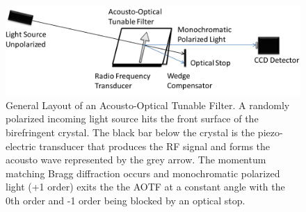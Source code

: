 \begin{figure}
    \includegraphics[width=1.0\textwidth]{./Images/3-1-AOTFGeneralLayout.pdf}
    \caption[Layout of an AOTF]{General Layout of an Acousto-Optical Tunable Filter. A randomly polarized incoming light source hits the front surface of the birefringent crystal. The black bar below the crystal is the piezo-electric transducer that produces the RF signal and forms the acousto wave represented by the grey arrow. The momentum matching Bragg diffraction occurs and monochromatic polarized light (+1 order) exits the the AOTF at a constant angle with the 0th order and -1 order being blocked by an optical stop.}
    \label{fig:3.1:AOTFLayout}
\end{figure}

